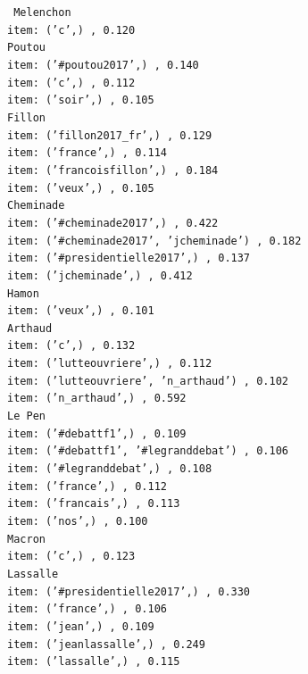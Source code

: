 \documentclass[a4paper]{article}
\theoremstyle{definition}
\begin{document}
\begin{figure}
\begingroup
\fontsize{9pt}{12pt}
\texttt{ 
Melenchon\\
item: ('c',) , 0.120\\
Poutou\\
item: ('\#poutou2017',) , 0.140\\
item: ('c',) , 0.112\\
item: ('soir',) , 0.105\\
Fillon\\
item: ('fillon2017\_fr',) , 0.129\\
item: ('france',) , 0.114\\
item: ('francoisfillon',) , 0.184\\
item: ('veux',) , 0.105\\
Cheminade\\
item: ('\#cheminade2017',) , 0.422\\
item: ('\#cheminade2017', 'jcheminade') , 0.182\\
item: ('\#presidentielle2017',) , 0.137\\
item: ('jcheminade',) , 0.412\\
Hamon\\
item: ('veux',) , 0.101\\
Arthaud\\
item: ('c',) , 0.132\\
item: ('lutteouvriere',) , 0.112\\
item: ('lutteouvriere', 'n\_arthaud') , 0.102\\
item: ('n\_arthaud',) , 0.592\\
Le Pen\\
item: ('\#debattf1',) , 0.109\\
item: ('\#debattf1', '\#legranddebat') , 0.106\\
item: ('\#legranddebat',) , 0.108\\
item: ('france',) , 0.112\\
item: ('francais',) , 0.113\\
item: ('nos',) , 0.100\\
Macron\\
item: ('c',) , 0.123\\
Lassalle\\
item: ('\#presidentielle2017',) , 0.330\\
item: ('france',) , 0.106\\
item: ('jean',) , 0.109\\
item: ('jeanlassalle',) , 0.249\\
item: ('lassalle',) , 0.115\\
}
\end{figure}
\end{document}
